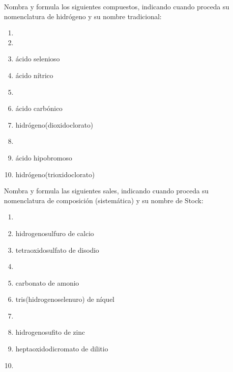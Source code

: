 \documentclass[10pt]{article}
\begin{document}
\begin{exercise}[
    tags    = {inorgánica,ácidos,ácidos binarios,ácidos ternarios,oxoácidos},
    topics  = {química inorgánica,formulación,nomenclatura},
    source  = {SAN Formulación, p28, e36},
  ]

  Nombra y formula los siguientes compuestos, indicando cuando proceda su nomenclatura de hidrógeno y su nombre tradicional:

  \begin{enumerate}
    \item {}
    \item {}
    \item ácido selenioso
    \item ácido nítrico
    \item {}
    \item ácido carbónico
    \item hidrógeno(dioxidoclorato)
    \item {}
    \item ácido hipobromoso
    \item hidrógeno(trioxidoclorato)
  \end{enumerate}
\end{exercise}


\begin{exercise}[
    tags    = {inorgánica,sales, sales binarias,sales ternarias},
    topics  = {química inorgánica,formulación,nomenclatura},
    source  = {SAN Formulación, p29, e37},
  ]

  Nombra y formula las siguientes sales, indicando cuando proceda su nomenclatura de composición (sistemática) y su nombre de Stock:

  \begin{enumerate}
    \item {}
    \item hidrogenosulfuro de calcio
    \item tetraoxidosulfato de disodio
    \item {}
    \item carbonato de amonio
    \item tris(hidrogenoselenuro) de níquel
    \item {}
    \item hidrogenosufito de zinc
    \item heptaoxidodicromato de dilitio
    \item {}
  \end{enumerate}
\end{exercise}
\end{document}
